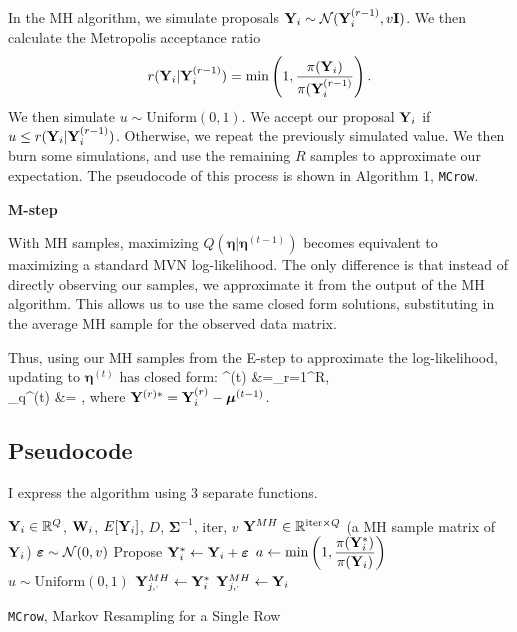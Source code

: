 \documentclass{template}
\begin{document}
In the MH algorithm, we simulate proposals $\mathbf{Y}_i\sim \mathcal{N}(\mathbf{Y}_i^{(r-1)},v\mathbf{I})$.  We then calculate the Metropolis acceptance ratio 
$$ r(\mathbf{Y}_i|\mathbf{Y}_i^{(r-1)}) = \min \left(1,\dfrac{\pi(\mathbf{Y}_i)}{\pi(\mathbf{Y}_i^{(r-1)}}\right).$$
We then simulate $u\sim \text{Uniform}(0,1)$. We accept our proposal $\mathbf{Y}_i$ if $u\leq r(\mathbf{Y}_i|\mathbf{Y}_i^{(r-1)})$. Otherwise, we repeat the previously simulated value. We then burn some simulations, and use the remaining $R$ samples to approximate our expectation. The pseudocode of this process is shown in Algorithm 1, \texttt{MCrow}.




\noindent\textbf{M-step}

With MH samples,  maximizing $Q(\boldsymbol{\eta}|\boldsymbol{\eta}^{(t-1)})$ becomes equivalent to maximizing a standard MVN log-likelihood. The only difference is that instead of directly observing our samples, we approximate it from the output of the MH algorithm. This allows us to use the same closed form solutions, substituting in the average MH sample for the observed data matrix.

Thus, using our MH samples from the E-step to approximate the log-likelihood, updating to  $\boldsymbol{\eta}^{(t)}$ has closed form:
\bal 
\boldsymbol{\Sigma}^{(t)} &=\sum_{r=1}^{R},\\
\boldsymbol{\mu}_{q}^{(t)} &= \onen\sumi {},
\eal 
where $\mathbf{Y}^{(r)*}=\mathbf{Y}_i^{(r)}-\boldsymbol{\mu}^{(t-1)}$.


\subsection{Pseudocode}

 I express the algorithm using 3 separate functions.


\FloatBarrier 
\begin{algorithm}[ht!]
\begin{algorithmic}[1]
\Input $\mathbf{Y}_i\in\mathbb{R}^{Q}$, $\mathbf{W}_i$, $E[\mathbf{Y}_i]$, $D$, $\boldsymbol{\Sigma}^{-1}$, iter, $v$
\Output $\mathbf{Y}^{MH}\in\mathbb{R}^{\text{iter}\times Q}$ (a MH sample matrix of $\mathbf{Y}_i$)
\State $\boldsymbol{\varepsilon} \sim \mathcal{N}(0,v)$
\State Propose $\mathbf{Y}_i^* \gets \mathbf{Y}_i+\boldsymbol{\varepsilon}$
\State $a \gets \min\left(1,\dfrac{\pi(\mathbf{Y}_i^*)}{\pi(\mathbf{Y}_i)}\right)$
\State $u \sim \text{Uniform}(0,1)$
\State $\mathbf{Y}^{MH}_{j,\cdot} \gets \mathbf{Y}_i^*$
\Else 
\State $\mathbf{Y}^{MH}_{j,\cdot} \gets \mathbf{Y}_i$
\EndIf
\EndFor
{}
\end{algorithmic}
\caption{\texttt{MCrow}, Markov Resampling for a Single Row}
\end{algorithm}
\end{document}
